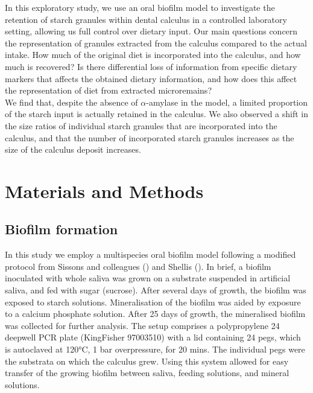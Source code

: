 \documentclass[
  b5paper,
]{book}
\begin{document}
In this exploratory study, we use an oral biofilm model to investigate
the retention of starch granules within dental calculus in a controlled
laboratory setting, allowing us full control over dietary input. Our
main questions concern the representation of granules extracted from the
calculus compared to the actual intake. How much of the original diet is
incorporated into the calculus, and how much is recovered? Is there
differential loss of information from specific dietary markers that
affects the obtained dietary information, and how does this affect the
representation of diet from extracted microremains?\\
We find that, despite the absence of \(\alpha\)-amylase in the model, a
limited proportion of the starch input is actually retained in the
calculus. We also observed a shift in the size ratios of individual
starch granules that are incorporated into the calculus, and that the
number of incorporated starch granules increases as the size of the
calculus deposit increases.

\section{Materials and Methods}\label{materials-and-methods-1}

\subsection{Biofilm formation}\label{biofilm-formation}

In this study we employ a multispecies oral biofilm model following a
modified protocol from Sissons and colleagues
() and Shellis
(). In brief, a biofilm
inoculated with whole saliva was grown on a substrate suspended in
artificial saliva, and fed with sugar (sucrose). After several days of
growth, the biofilm was exposed to starch solutions. Mineralisation of
the biofilm was aided by exposure to a calcium phosphate solution. After
25 days of growth, the mineralised biofilm was collected for further
analysis. The setup comprises a polypropylene 24 deepwell PCR plate
(KingFisher 97003510) with a lid containing 24 pegs, which is autoclaved
at 120°C, 1 bar overpressure, for 20 mins. The individual pegs were the
substrata on which the calculus grew. Using this system allowed for easy
transfer of the growing biofilm between saliva, feeding solutions, and
mineral solutions.
\end{document}
